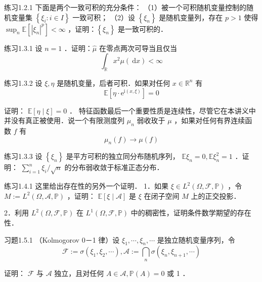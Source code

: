 \begin{namedthm}{练习1.2.1}
    下面是两个一致可积的充分条件：
（1）被一个可积随机变量控制的随机变量集 $\left\{\xi_{i}: i \in I\right\}$ 一致可积；
（2）设 $\left\{\xi_{n}\right\}$ 是随机变量列，存在 $p>1$ 使得 $\sup _{n} \mathbb{E}\left[\left|\xi_{n}\right|^{p}\right]<\infty$ ，证明：$\left\{\xi_{n}\right\}$ 是一致可积的．
\end{namedthm}

\begin{namedthm}{练习1.3.1}
设 $n=1$ ．证明：$\hat{\mu}$ 在零点两次可导当且仅当
$$
\int_{\mathbb{R}} x^{2} \mu(\mathrm{~d} x)<\infty
$$
\end{namedthm}

\begin{namedthm}{练习1.3.2}
设 $\xi, \eta$ 是随机变量，后者可积．如果对任何 $x \in \mathbb{R}^{n}$ 有
$$
\mathbb{E}\left[\eta \cdot \mathrm{e}^{\mathrm{i}(x, \xi)}\right]=0
$$

证明： $\mathbb{E}[\eta \mid \xi]=0$ ．
特征函数最后一个重要性质是连续性，尽管它在本讲义中并没有真正被使用．说一个有限测度列 $\mu_{n}$ 弱收玫于 $\mu$ ，如果对任何有界连续函数 $f$ 有
$$
\mu_{n}(f) \longrightarrow \mu(f)
$$
\end{namedthm}

\begin{namedthm}{练习1.3.3}
设 $\left\{\xi_{n}\right\}$ 是平方可积的独立同分布随机序列， $\mathbb{E} \xi_{n}=0, \mathbb{E} \xi_{n}^{2}=1$ ．证明： $\sum_{i=1}^{n} \xi_{i} / \sqrt{n}$ 的分布弱收敛于标准正态分布．
\end{namedthm}

\begin{namedthm}{练习1.4.1}
    这里给出存在性的另外一个证明．
1．如果 $\xi \in L^{2}(\Omega, \mathscr{F}, \mathbb{P})$ ，令 $M:=L^{2}(\Omega, \mathscr{A}, \mathbb{P})$ ，证明： $\mathbb{E}[\xi \mid \mathscr{A}]$ 是 $\xi$ 在闭子空间 $M$ 上的正交投影．

2．利用 $L^{2}(\Omega, \mathscr{F}, \mathbb{P})$ 在 $L^{1}(\Omega, \mathscr{F}, \mathbb{P})$ 中的稠密性，证明条件数学期望的存在性．
\end{namedthm}

\begin{namedthm}{习题1.5.1}
（Kolmogorov 0－1 律）设 $\xi_{1}, \cdots, \xi_{n}, \cdots$ 是独立随机变量序列，令
$$
\mathscr{F}:=\sigma\left(\xi_{1}, \xi_{2}, \cdots\right), \mathscr{A}:=\bigcap_{n} \sigma\left(\xi_{n}, \xi_{n+1}, \cdots\right)
$$

证明： $\mathscr{F}$ 与 $\mathscr{A}$ 独立，且对任何 $A \in \mathscr{A}, \mathbb{P}(A)=0$ 或 1 ．
\end{namedthm}

